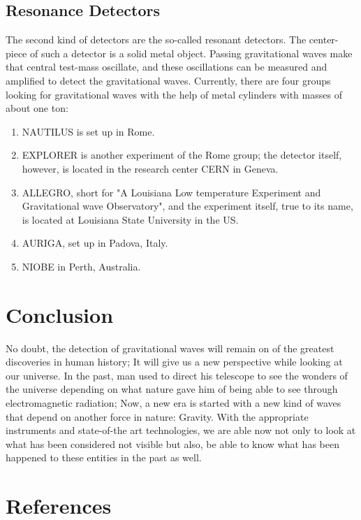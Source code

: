 \documentclass[11]{article}
\begin{document}
\subsection{Resonance Detectors}
The second kind of detectors are the so-called resonant detectors. The center-piece of such a detector is a solid metal object. Passing gravitational waves make that central test-mass oscillate, and these oscillations can be measured and amplified to detect the gravitational waves. Currently, there are four groups looking for gravitational waves with the help of metal cylinders with masses of about one ton:
\begin{enumerate}

\item NAUTILUS is set up in Rome.

\item EXPLORER is another experiment of the Rome group; the detector itself, however, is located in the research center CERN in Geneva.

\item ALLEGRO, short for "A Louisiana Low temperature Experiment and Gravitational wave Observatory", and the experiment itself, true to its name, is located at Louisiana State University in the US.

\item AURIGA, set up in Padova, Italy.

\item NIOBE in Perth, Australia.
\end{enumerate}

\section{Conclusion}
No doubt, the detection of gravitational waves will remain on of the greatest discoveries in human history; It will give us a new perspective while looking at our universe. In the past, man used to direct his telescope to see the wonders of the universe depending on what nature gave him of being able to see through electromagnetic radiation; Now, a new era is started with a new kind of waves that depend on another force in nature: Gravity. With the appropriate instruments and state-of-the art technologies, we are able now not only to look at what has been considered not visible but also, be able to know what has been happened to these entities in the past as well.

\newpage

\section{References}
      
\end{document}
